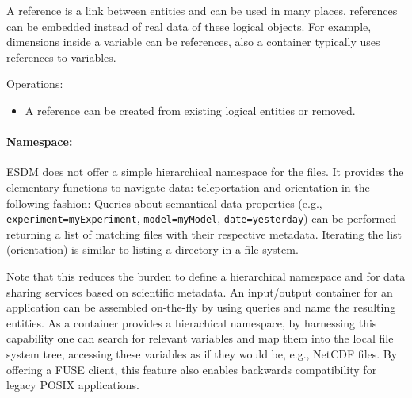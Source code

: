 A reference is a link between entities and can be used in many places, references can be embedded instead of real data of these logical objects.
For example, dimensions inside a variable can be references, also a container typically uses references to variables.
 
Operations:

\begin{itemize}
  \item A reference can be created from existing logical entities or removed.
\end{itemize}


\paragraph{Namespace:}%
\label{namespace}

ESDM does not offer a simple hierarchical namespace for the files.
It provides the elementary functions to navigate data: teleportation and orientation in the following fashion: Queries about semantical data properties (e.g., \texttt{experiment=myExperiment}, \texttt{model=myModel}, \texttt{date=yesterday}) can be performed returning a list of matching files with their respective metadata.
Iterating the list (orientation) is similar to listing a directory in a file system.
 
Note that this reduces the burden to define a hierarchical namespace and for data sharing services based on scientific metadata.
An input/output container for an application can be assembled on-the-fly by using queries and name the resulting entities.
As a container provides a hierachical namespace, by harnessing this capability one can search for relevant variables and map them into the local file system tree, accessing these variables as if they would be, e.g., NetCDF files.
By offering a FUSE client, this feature also enables backwards compatibility for legacy POSIX applications.
 
